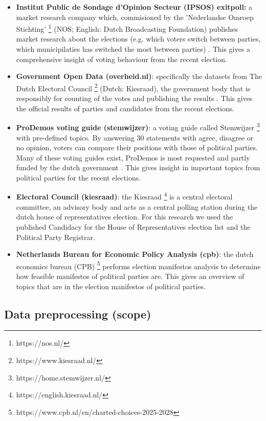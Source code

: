 \begin{itemize}
  \item \textbf{Institut Public de Sondage d'Opinion Secteur (IPSOS) exitpoll:} a market research company which, commisioned by the 'Nederlandse Omroep Stichting' \footnote{https://nos.nl/} (NOS; English: Dutch Broadcasting Foundation) publishes market research about the elections (e.g. which voters switch between parties, which municipilaties has switched the most between parties) \cite{nos}. This gives a comprehensive insight of voting behaviour from the recent election.
  \item \textbf{Government Open Data (overheid.nl)}: specifically the datasets from The Dutch Electoral Council \footnote{https://www.kiesraad.nl/} (Dutch: Kiesraad), the government body that is responsibly for counting of the votes and publishing the results \cite{kiesraad}. This gives the official results of parties and candidates from the recent elections.
  \item \textbf{ProDemos voting guide (stemwijzer)}: a voting guide called Stemwijzer \footnote{https://home.stemwijzer.nl/} with pre-defined topics. By answering 30 statements with agree, disagree or no opinion, voters can compare their positions with those of political parties. Many of these voting guides exist, ProDemos is most requested and partly funded by the dutch government \cite{prodemos}. This gives insight in important topics from political parties for the recent elections.
  \item \textbf{Electoral Council (kiesraad)}: the Kiesraad \footnote{https://english.kiesraad.nl/} is a central electoral committee, an advisory body and acts as a central polling station during the dutch house of representatives election. For this research we used the published Candidacy for the House of Representatives election list and the Political Party Registrar.
  \item \textbf{Netherlands Bureau for Economic Policy Analysis (cpb)}: the dutch economics bureau (CPB) \footnote{https://www.cpb.nl/en/charted-choices-2025-2028} performs election manifestos analysis to determine how feasible manifestos of political parties are. This gives an overview of topics that are in the election manifestos of political parties.
\end{itemize}

\subsection{Data preprocessing (scope)}

